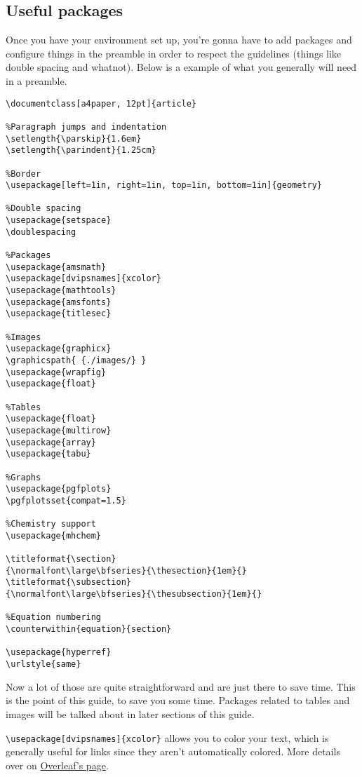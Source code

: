 \subsection{Useful packages}
Once you have your environment set up,
you're gonna have to add packages and configure things
in the preamble in order to respect the guidelines
(things like double spacing and whatnot).
Below is a example of what you generally will need in a preamble.
\begin{verbatim}
\documentclass[a4paper, 12pt]{article}

%Paragraph jumps and indentation
\setlength{\parskip}{1.6em}
\setlength{\parindent}{1.25cm}

%Border
\usepackage[left=1in, right=1in, top=1in, bottom=1in]{geometry}

%Double spacing
\usepackage{setspace}
\doublespacing

%Packages
\usepackage{amsmath}
\usepackage[dvipsnames]{xcolor}
\usepackage{mathtools}
\usepackage{amsfonts}
\usepackage{titlesec}

%Images
\usepackage{graphicx}
\graphicspath{ {./images/} }
\usepackage{wrapfig}
\usepackage{float}

%Tables
\usepackage{float}
\usepackage{multirow}
\usepackage{array}
\usepackage{tabu}

%Graphs
\usepackage{pgfplots}
\pgfplotsset{compat=1.5}

%Chemistry support
\usepackage{mhchem}

\titleformat{\section}
{\normalfont\large\bfseries}{\thesection}{1em}{}
\titleformat{\subsection}
{\normalfont\large\bfseries}{\thesubsection}{1em}{}

%Equation numbering
\counterwithin{equation}{section}

\usepackage{hyperref}
\urlstyle{same}
\end{verbatim}
Now a lot of those are quite straightforward and are just there to save time.
This is the point of this guide, to save you some time.
Packages related to tables and images will be talked about in later sections of this guide.

\verb|\usepackage[dvipsnames]{xcolor}| allows you to color your text,
which is generally useful for links since they aren't automatically colored.
More details over on \href{https://www.overleaf.com/learn/latex/Using_colours_in_LaTeX}{Overleaf's page}.

